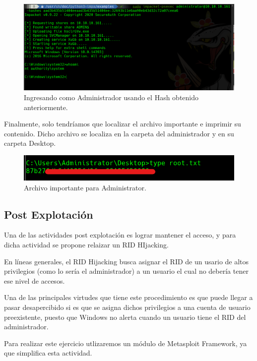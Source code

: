 \documentclass{article}
\begin{document}
\begin{figure}[H]
	\center
	\includegraphics[width=\textwidth]{images/forest/escalado_a_root.png}
	\caption{Ingresando como Administrador usando el Hash obtenido anteriormente.}
\end{figure}

Finalmente, solo tendríamos que localizar el archivo importante e imprimir su contenido. Dicho archivo se localiza en la carpeta del administrador y en su carpeta Desktop.

\begin{figure}[H]
	\center
	\includegraphics[width=\textwidth/2]{images/forest/rootflag.png}
	\caption{Archivo importante para Administrator.}
\end{figure}


\subsection{Post Explotación}
Una de las actividades post explotación es lograr mantener el acceso, y para dicha actividad se propone relaizar un RID HIjacking. 

En líneas generales, el RID Hijacking busca asignar el RID de un usario de altos privilegios (como lo sería el administrador) a un usuario el cual no debería tener ese nivel de accesos. 

Una de las principales virtudes que tiene este procedimiento es que puede llegar a pasar desapercibido si es que se asigna dichos privilegios a una cuenta de usuario preexistente, puesto que Windows no alerta cuando un usuario tiene el RID del administrador. 

Para realizar este ejercicio utlizaremos un módulo de Metasploit Framework, ya que simplifica esta actividad. 
\end{document}
